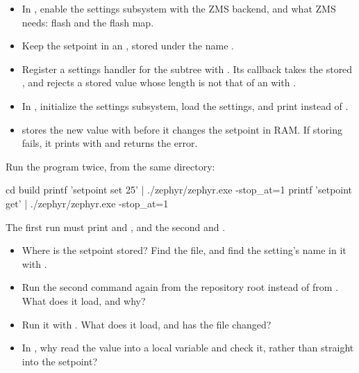 \begin{itemize}
  \item In , enable the settings subsystem with the ZMS backend, and what ZMS needs: flash
    and the flash map.
  \item Keep the setpoint in an , stored under the name .
  \item Register a settings handler for the subtree  with
    . Its  callback takes the stored ,
    and rejects a stored value whose length is not that of an  with .
  \item In , initialize the settings subsystem, load the settings, and print  instead of .
  \item {} stores the new value with  before it changes the
    setpoint in RAM. If storing fails, it prints  with
     and returns the error.
\end{itemize}

Run the program twice, from the same directory:

\begin{shell}
cd build
printf 'setpoint set 25\n' | ./zephyr/zephyr.exe -stop_at=1
printf 'setpoint get\n' | ./zephyr/zephyr.exe -stop_at=1
\end{shell}

\noindent The first run must print  and , and
the second  and .

\begin{itemize}
  \item Where is the setpoint stored? Find the file, and find the setting’s name in it with .
  \item Run the second command again from the repository root instead of from . What does it
    load, and why?
  \item Run it with . What does it load, and has the file changed?
  \item In , why read the value into a local variable and check it, rather than straight into
    the setpoint?
\end{itemize}

